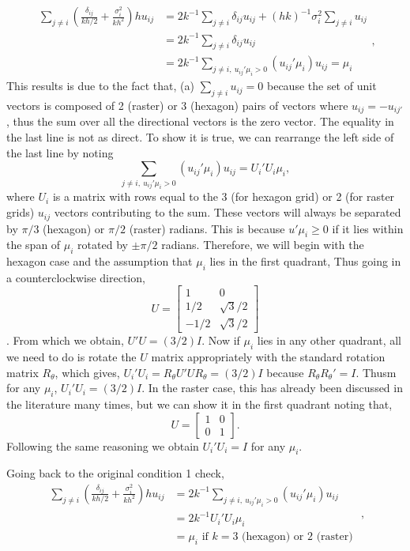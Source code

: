 \documentclass[12pt]{article}
\begin{document}
$$
\begin{aligned}
\sum_{j\ne i} \left(\frac{\delta_{ij}}{kh/2} + \frac{\sigma^2_i}{kh^2}\right) h u_{ij} 
&= 2k^{-1}\sum_{j\ne i} \delta_{ij}u_{ij} +  (hk)^{-1}\sigma^2_i\sum_{j\ne i}u_{ij} \\
&=  2k^{-1}\sum_{j\ne i} \delta_{ij}u_{ij} \\
&=  2k^{-1}\sum_{j\ne i,\ u_{ij}'\mu_i > 0} (u_{ij}'\mu_i)u_{ij} = \mu_i
\end{aligned},
$$ This results is due to the fact that, (a) $\sum_{j\ne i}u_{ij} = 0$ because the set of unit vectors is composed of 2 (raster) or 3 (hexagon) pairs of vectors where $u_{ij} = -u_{ij'}$, thus the sum over all the directional vectors is the zero vector. The equality in the last line is not as direct. To show it is true, we can rearrange the left side of the last line by noting $$
\sum_{j\ne i,\ u_{ij}'\mu_i > 0} (u_{ij}'\mu_i)u_{ij} = U_i'U_i\mu_i,
$$ where $U_i$ is a matrix with rows equal to the 3 (for hexagon grid) or 2 (for raster grids) $u_{ij}$ vectors contributing to the sum. These vectors will always be separated by $\pi/3$ (hexagon) or $\pi/2$ (raster) radians. This is because $u'\mu_i \ge 0$ if it lies within the span of $\mu_i$ rotated by $\pm \pi/2$ radians. Therefore, we will begin with the hexagon case and the assumption that $\mu_i$ lies in the first quadrant, Thus going in a counterclockwise direction, $$
U = \left[ 
\begin{array}{cc}
1 & 0 \\
1/2 & \sqrt{3}/2 \\
-1/2 & \sqrt{3}/2 
\end{array}
\right]
$$. From which we obtain, $U'U = (3/2)I$. Now if $\mu_i$ lies in any other quadrant, all we need to do is rotate the $U$ matrix appropriately with the standard rotation matrix $R_\theta$, which gives, $U_i'U_i = R_\theta U' U R_\theta = (3/2)I$ because $R_\theta R_\theta' = I$. Thusm for any $\mu_i$, $U_i'U_i = (3/2)I$. In the raster case, this has already been discussed in the literature many times, but we can show it in the first quadrant noting that, $$
U = \left[ 
\begin{array}{cc}
1 & 0 \\
0 &1 
\end{array}
\right].
$$ Following the same reasoning we obtain $U_i'U_i = I$ for any $\mu_i$.

Going back to the original condition 1 check, $$
\begin{aligned}
\sum_{j\ne i} \left(\frac{\delta_{ij}}{kh/2} + \frac{\sigma^2_i}{kh^2}\right) h u_{ij} &=  2k^{-1}\sum_{j\ne i,\ u_{ij}'\mu_i > 0} (u_{ij}'\mu_i)u_{ij} \\
&= 2k^{-1}U_i'U_i\mu_i \\
&= \mu_i \text{ if } k = 3 \text{ (hexagon) or } 2 \text{ (raster) }
\end{aligned},
$$
\end{document}
